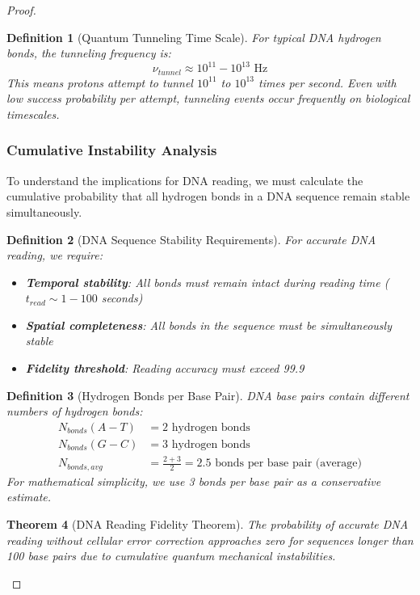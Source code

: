 \documentclass[12pt,a4paper]{article}
\newtheorem{theorem}{Theorem}[section]
\newtheorem{definition}[theorem]{Definition}
\begin{document}
\begin{proof}
\begin{definition}[Quantum Tunneling Time Scale]
For typical DNA hydrogen bonds, the tunneling frequency is:
\begin{equation}
\nu_{tunnel} \approx 10^{11} - 10^{13} \text{ Hz}
\end{equation}
This means protons attempt to tunnel $10^{11}$ to $10^{13}$ times per second. Even with low success probability per attempt, tunneling events occur frequently on biological timescales.
\end{definition}

\subsubsection{Cumulative Instability Analysis}

To understand the implications for DNA reading, we must calculate the cumulative probability that all hydrogen bonds in a DNA sequence remain stable simultaneously.

\begin{definition}[DNA Sequence Stability Requirements]
For accurate DNA reading, we require:
\begin{itemize}
\item \textbf{Temporal stability}: All bonds must remain intact during reading time ($t_{read} \sim 1-100$ seconds)
\item \textbf{Spatial completeness}: All bonds in the sequence must be simultaneously stable
\item \textbf{Fidelity threshold}: Reading accuracy must exceed 99.9%
\end{itemize}
\end{definition}

\begin{definition}[Hydrogen Bonds per Base Pair]
DNA base pairs contain different numbers of hydrogen bonds:
\begin{align}
N_{bonds}(A-T) &= 2 \text{ hydrogen bonds} \\
N_{bonds}(G-C) &= 3 \text{ hydrogen bonds} \\
N_{bonds,avg} &= \frac{2 + 3}{2} = 2.5 \text{ bonds per base pair (average)}
\end{align}
For mathematical simplicity, we use 3 bonds per base pair as a conservative estimate.
\end{definition}

\begin{theorem}[DNA Reading Fidelity Theorem]
The probability of accurate DNA reading without cellular error correction approaches zero for sequences longer than 100 base pairs due to cumulative quantum mechanical instabilities.
\end{theorem}


\end{proof}
\end{document}
